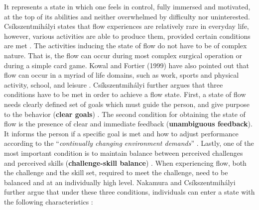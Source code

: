 It represents a state in which one feels in control, fully immersed and motivated, at the top of its abilities and neither overwhelmed by difficulty nor uninterested. Cs\'{i}kszentmih\'{a}lyi states that flow experiences are relatively rare in everyday life, however, various activities are able to produce them, provided certain conditions are met \cite{csikszentmihalyi2014flow}. The activities inducing the state of flow do not have to be of complex nature. That is, the flow can occur during most complex surgical operation or during a simple card game. Kowal and Fortier (1999) have also pointed out that flow can occur in a myriad of life domains, such as work, sports and physical activity, school, and leisure \cite{kowal1999motivational}. Cs\'{i}kszentmih\'{a}lyi further argues that three conditions have to be met in order to achieve a flow state. First, a state of flow needs clearly defined set of goals which must guide the person, and give purpose to the behavior (\textbf{clear goals}) \cite{csikszentmihalyi2014flow}. The second condition for obtaining the state of flow is the presence of clear and immediate feedback (\textbf{unambiguous
feedback}). It informs the person if a specific goal is met and how to adjust performance according to the ``\textit{continually  changing environment demands}'' \cite{csikszentmihalyi2014flow}. Lastly, one of the most important condition is to maintain balance between perceived challenges and perceived skills (\textbf{challenge-skill balance}) \cite{csikszentmihalyi2014flow}. When experiencing flow, both the challenge and the skill set, required to meet the challenge, need to be balanced and at an individually high level. Nakamura and Cs\'{i}kszentmih\'{a}lyi further argue that under these three conditions, individuals can enter a state with the following characteristics \cite{nakamura2014concept, csikszentmihalyi2014flow}:
